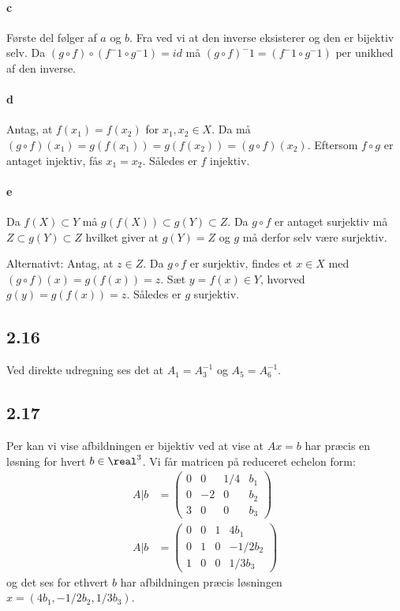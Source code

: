 			\paragraph{c} Første del følger af $a$ og $b$. Fra \cite[Lemma 0.1.3]{hesselholt2017} ved vi at den inverse eksisterer og den er bijektiv selv. Da $(g \circ f) \circ (f^-1 \circ g^-1)=id$ må $(g \circ f)^-1=(f^-1 \circ g^-1)$ per unikhed af den inverse.

			\paragraph{d} Antag, at $f(x_1) = f(x_2)$ for $x_1, x_2 \in X$. Da må $(g \circ f)(x_1) = g(f(x_1)) = g(f(x_2)) = (g \circ f)(x_2)$. Eftersom $f \circ g$ er antaget injektiv, fås $x_1 = x_2$. Således er $f$ injektiv.

			\paragraph{e} Da $f(X)\subset Y$ må $g(f(X)) \subset g(Y) \subset Z$. Da $g \circ f$ er antaget surjektiv må $Z \subset g(Y) \subset Z$ hvilket giver at $g(Y)=Z$ og $g$ må derfor selv være surjektiv.
			
			Alternativt: Antag, at $z \in Z$. Da $g \circ f$ er surjektiv, findes et $x \in X$ med $(g \circ f)(x) = g(f(x)) = z$. Sæt $y = f(x) \in Y$, hvorved $g(y) = g(f(x)) = z$. Således er $g$ surjektiv.

		\subsection{2.16}
			Ved direkte udregning ses det at $A_1=A_3^{-1}$ og $A_5=A_6^{-1}$.

		\subsection{2.17} 

			Per \cite[sætning 2.4.9]{hesselholt2017} kan vi vise afbildningen er bijektiv ved at vise at $Ax=b$ har præcis en løsning for hvert $b\in \real^3$.  Vi får matricen på reduceret echelon form:
				\begin{align*}
					A|b&=\left(\begin{array}{ccc|c}{0} & {0} & {1 / 4} & {b_1} \\ {0} & {-2} & {0} & {b_2} \\ {3} & {0} & {0} & {b_3} \end{array}\right) \\
					A|b&=\left(\begin{array}{ccc|c}{0} & {0} & {1} & {4b_1} \\ {0} & {1} & {0} & {-1/2b_2} \\ {1} & {0} & {0} & {1/3b_3} \end{array}\right) 
				\end{align*} 
			og det ses for ethvert $b$ har afbildningen præcis løsningen $x=(4b_1,-1/2b_2,1/3b_3)$.

